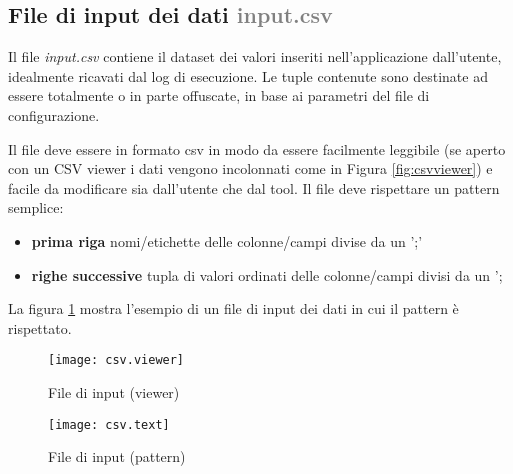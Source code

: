 \subsection*{File di input dei dati \textcolor{gray}{input.csv} }   
\label{filediinputdeidati}
Il file \emph{input.csv} contiene il dataset dei valori inseriti nell'applicazione dall'utente, idealmente ricavati dal log di esecuzione. Le tuple contenute sono destinate ad essere totalmente o in parte offuscate, in base ai parametri del file di configurazione. 

\noindent Il file deve essere in formato csv in modo da essere facilmente leggibile (se aperto con un CSV viewer i dati vengono incolonnati come in Figura  \ref{fig:csvviewer}) e facile da modificare sia dall'utente che dal tool. Il file deve rispettare un pattern semplice: 

 \begin{itemize} [nosep]	
		\item[] \textbf{prima riga } \quad nomi/etichette delle colonne/campi  divise da un ';'
		\item[] \textbf{righe successive } \quad tupla di valori ordinati delle colonne/campi divisi da un ';
\end{itemize}
\noindent La figura  \ref{fig:csvtext}  mostra l'esempio di un file di input dei dati in cui il pattern è rispettato.

\begin{figure}[H]
    \centering
    \begin{minipage}{0.4\textwidth}
        \centering
        \texttt{[image: csv.viewer]} 
        \caption{File di input (viewer)}
            \label{fig:csvviewer}
    \end{minipage}\hfill
    \begin{minipage}{0.6\textwidth}
        \centering
        \texttt{[image: csv.text]} 
        \caption{File di input (pattern)}
            \label{fig:csvtext}
    \end{minipage}
\end{figure}


